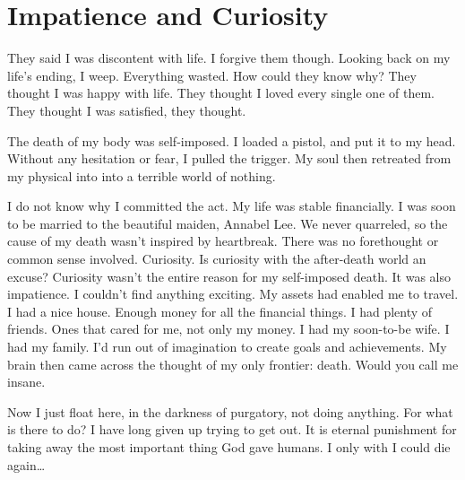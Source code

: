 \chapter{Impatience and Curiosity}

They said I was discontent with life. I forgive them though. Looking
back on my life's ending, I weep. Everything wasted. How could they know
why? They thought I was happy with life. They thought I loved every
single one of them. They thought I was satisfied, they thought.

The death of my body was self-imposed. I loaded a pistol, and put it to
my head. Without any hesitation or fear, I pulled the trigger. My soul
then retreated from my physical into into a terrible world of nothing.

I do not know why I committed the act. My life was stable financially. I
was soon to be married to the beautiful maiden, Annabel Lee. We never
quarreled, so the cause of my death wasn't inspired by heartbreak. There
was no forethought or common sense involved. Curiosity. Is curiosity
with the after-death world an excuse? Curiosity wasn't the entire reason
for my self-imposed death. It was also impatience. I couldn't find
anything exciting. My assets had enabled me to travel. I had a nice
house. Enough money for all the financial things. I had plenty of
friends. Ones that cared for me, not only my money. I had my soon-to-be
wife. I had my family. I'd run out of imagination to create goals and
achievements. My brain then came across the thought of my only frontier:
death. Would you call me insane.

Now I just float here, in the darkness of purgatory, not doing
anything. For what is there to do? I have long given up trying to get
out. It is eternal punishment for taking away the most important thing
God gave humans. I only with I could die again\ldots
